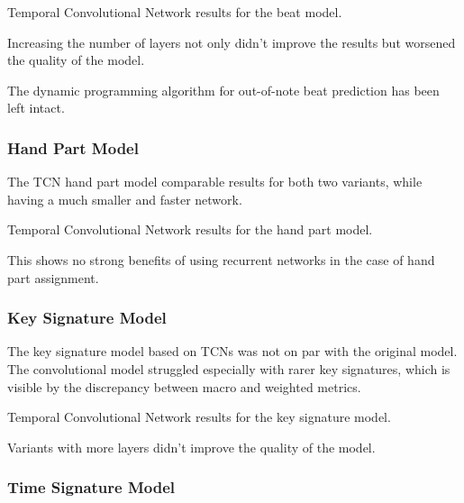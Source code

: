 \begin{table}[ht!]
\centering

\caption[Temporal Convolutional Network results for the beat model.]{Temporal Convolutional Network results for the beat model.}
\label{beat_tcn}
\end{table}

Increasing the number of layers not only didn't improve the results but worsened the quality of the model.

The dynamic programming algorithm for out-of-note beat prediction has been left intact.

\subsubsection{Hand Part Model}

The TCN hand part model comparable results for both two variants, while having a much smaller and faster network.

\begin{table}[ht!]
\centering

\caption[Temporal Convolutional Network results for the hand part model.]{Temporal Convolutional Network results for the hand part model.}
\label{hand_part_tcn}
\end{table}

This shows no strong benefits of using recurrent networks in the case of hand part assignment.

\subsubsection{Key Signature Model}

The key signature model based on TCNs was not on par with the original model. The convolutional model struggled especially with rarer key signatures, which is visible by the discrepancy between macro and weighted metrics. 

\begin{table}[ht!]
\centering

\caption[Temporal Convolutional Network results for the key signature model.]{Temporal Convolutional Network results for the key signature model.}
\label{key_signature_tcn}
\end{table}

Variants with more layers didn't improve the quality of the model.

\subsubsection{Time Signature Model}

